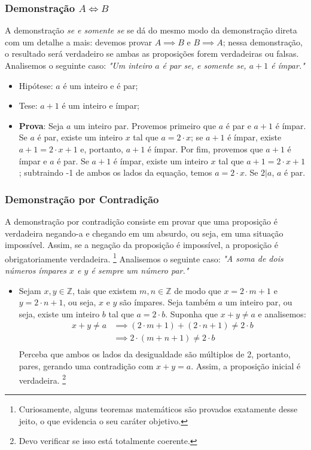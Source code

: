 \documentclass[13pt,letterpaper]{article}
\begin{document}
\subsubsection{Demonstração $A \iff B$}
A demonstração \emph{se e somente se} se dá do mesmo modo da demonstração direta com um detalhe a mais: devemos provar $A \implies B$ e $B \implies A$; nessa demonstração, o resultado será verdadeiro se ambas as proposições forem verdadeiras ou falsas.
Analisemos o seguinte caso: \emph{"Um inteiro $a$ é par se, e somente se, $a + 1$ é ímpar."}
\begin{itemize}
    \item Hipótese: $a$ é um inteiro e é par;
    \item Tese: $a + 1$ é um inteiro e ímpar;
    \item \textbf{Prova}: Seja $a$ um inteiro par. Provemos primeiro que $a$ é par e $a + 1$ é ímpar. Se $a$ é par, existe um inteiro $x$ tal que $a = 2 \cdot x$; se $a + 1$ é ímpar, existe $a + 1 = 2 \cdot x + 1$ e, portanto, $a + 1$ é ímpar.
    Por fim, provemos que $a + 1$ é ímpar e $a$ é par.
    Se $a + 1$ é ímpar, existe um inteiro $x$ tal que $a + 1 = 2 \cdot x + 1$; subtraindo -1 de ambos os lados da equação, temos $a = 2 \cdot x$. Se $2|a$, $a$ é par.
    
\end{itemize}

\subsubsection{Demonstração por Contradição}
A demonstração por contradição consiste em provar que uma proposição é verdadeira negando-a e chegando em um absurdo, ou seja, em uma situação impossível. Assim, se a negação da proposição é impossível, a proposição é obrigatoriamente verdadeira. \footnote{Curiosamente, alguns teoremas matemáticos são provados exatamente desse jeito, o que evidencia o seu caráter objetivo.}
Analisemos o seguinte caso: \emph{"A soma de dois números ímpares $x$ e $y$ é sempre um número par."}
\begin{itemize}
    \item Sejam $x, y \in \mathbb{Z}$, tais que existem $m, n \in \mathbb{Z}$ de modo que $x = 2 \cdot m + 1$ e $y = 2 \cdot n + 1$, ou seja, $x$ e $y$ são ímpares. Seja também $a$ um inteiro par, ou seja, existe um inteiro $b$ tal que $a = 2 \cdot b$. Suponha que $x + y \ne a$ e analisemos:
    \begin{align*}
        x + y \ne a &\implies
        (2 \cdot m + 1) + (2 \cdot n + 1) \ne 2 \cdot b \\ &\implies
        2 \cdot (m + n + 1) \ne 2 \cdot b \\
    \end{align*}
    Perceba que ambos os lados da desigualdade são múltiplos de 2, portanto, pares, gerando uma contradição com $x + y = a$. Assim, a proposição inicial é verdadeira. \footnote{Devo verificar se isso está totalmente coerente.}
\end{itemize}
\newpage
\end{document}
